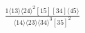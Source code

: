 \documentclass[varwidth, border=5pt]{standalone}
\begin{document}
\begin{my}
$\begin{gathered}
\scriptscriptstyle\frac{1⟨13⟩⟨24⟩^2[15][34]⟨45⟩}{⟨14⟩⟨23⟩⟨34⟩^3[35]^2}
\end{gathered}$
\end{my}
\end{document}
